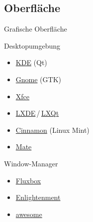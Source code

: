 \documentclass{beamer}
\begin{document}
\subsection{Oberfläche}

\begin{frame}{Grafische Oberfläche}
    \begin{block}{Desktopumgebung}
        \begin{itemize}
            \item \href{https://www.kde.org/}{KDE} (Qt)
            \item \href{https://www.gnome.org/}{Gnome} (GTK)
            \item \href{https://xfce.org/}{Xfce}
            \item
                \href{https://lxde.org/}{LXDE}\,/\,\href{https://lxqt.org/}{LXQt}
            \item \href{https://github.com/linuxmint/Cinnamon}{Cinnamon}
                (Linux Mint)
            \item \href{http://mate-desktop.org/}{Mate}
        \end{itemize}
    \end{block}
    \pause
    \begin{block}{Window-Manager}
        \begin{itemize}
            \item \href{http://fluxbox.org/}{Fluxbox}
            \item \href{https://www.enlightenment.org/}{Enlightenment}
            \item \href{https://awesomewm.org/}{awesome}
        \end{itemize}
    \end{block}
\end{frame}
\end{document}
